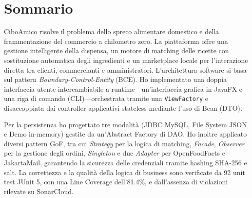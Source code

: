 \documentclass[12pt,a4paper,oneside]{report}
\begin{document}
\chapter*{Sommario}

CiboAmico risolve il problema dello spreco alimentare domestico e della frammentazione del commercio a chilometro zero. La piattaforma offre una gestione intelligente della dispensa, un motore di matching delle ricette con sostituzione automatica degli ingredienti e un marketplace locale per l'interazione diretta tra clienti, commercianti e amministratori. L'architettura software si basa sul pattern \emph{Boundary-Control-Entity} (BCE). Ho implementato una doppia interfaccia utente intercambiabile a runtime---un'interfaccia grafica in JavaFX e una riga di comando (CLI)---orchestrata tramite una \texttt{ViewFactory} e disaccoppiata dai controller applicativi stateless mediante l'uso di Bean (DTO).

Per la persistenza ho progettato tre modalità (JDBC MySQL, File System JSON e Demo in-memory) gestite da un'Abstract Factory di DAO. Ho inoltre applicato diversi pattern GoF, tra cui \emph{Strategy} per la logica di matching, \emph{Facade}, \emph{Observer} per la gestione degli ordini, \emph{Singleton} e due \emph{Adapter} per OpenFoodFacts e JakartaMail, garantendo la sicurezza delle credenziali tramite hashing SHA-256 e salt. La correttezza e la qualità della logica di business sono verificate da 92 unit test JUnit 5, con una Line Coverage dell'81.4\%, e dall'assenza di violazioni rilevate su SonarCloud.

\newpage

\tableofcontents
\newpage









\end{document}
